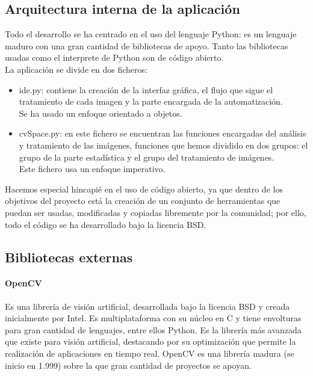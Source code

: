 	\subsection{Arquitectura interna de la aplicación}
	Todo el desarrollo se ha centrado en el uso del lenguaje Python: es un lenguaje maduro con una gran cantidad de bibliotecas de apoyo. Tanto las bibliotecas usadas como el interprete de Python son de código abierto.\\
	La aplicación se divide en dos ficheros:
	\begin{itemize}
	\item ide.py: contiene la creación de la interfaz gráfica, el flujo que sigue el tratamiento de cada imagen y la parte encargada de la automatización.\\ Se ha usado un enfoque orientado a objetos.
	\item cvSpace.py: en este fichero se encuentran las funciones encargadas del análisis y tratamiento de las imágenes, funciones que hemos dividido en dos grupos: el grupo de la parte estadística y el grupo del tratamiento de imágenes.\\ Este fichero usa un enfoque imperativo.
	\end{itemize}
	
	 Hacemos especial hincapié en el uso de código abierto, ya que dentro de los objetivos del proyecto está la creación de un conjunto de herramientas que puedan ser usadas, modificadas y copiadas libremente por la comunidad; por ello, todo el código se ha desarrollado bajo la licencia BSD.
	\subsection{Bibliotecas externas}
	\paragraph{OpenCV}
	Es una librería de visión artificial, desarrollada bajo la licencia BSD y creada inicialmente por Intel. Es multiplataforma con su núcleo en C y tiene envolturas para gran cantidad de lenguajes, entre ellos Python. Es la librería más avanzada que existe para visión artificial, destacando por su optimización que permite la realización de aplicaciones en tiempo real. OpenCV es una librería madura (se inicio en 1.999) sobre la que gran cantidad de proyectos se apoyan.\\
